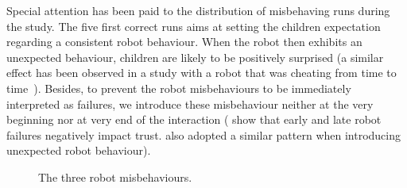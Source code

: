 \documentclass{sig-alternate}
\begin{document}
Special attention has been paid to the distribution of misbehaving runs during
the study. The five first correct runs aims at setting the children expectation
regarding a consistent robot behaviour. When the robot then exhibits an
unexpected behaviour, children are likely to be positively surprised (a similar
effect has been observed in a study with a robot that was cheating from time to
time~\cite{short_no_2010}).  Besides, to prevent the robot misbehaviours to be
immediately interpreted as failures, we introduce these misbehaviour neither at
the very beginning nor at very end of the interaction
(\cite{desai_effects_2012,desai_impact_2013} show that early and late robot
failures negatively impact trust. \cite{short_no_2010} also adopted a similar
pattern when introducing unexpected robot behaviour).

\begin{figure}[!t]
    \centering
    \caption{\small The three robot misbehaviours.}
    \label{fig:domino-misbehaviour}
\end{figure}
\end{document}
